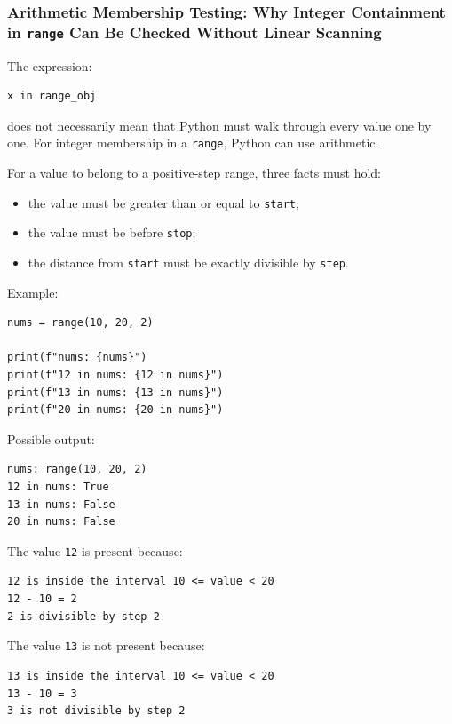 \documentclass[a4paper,twoside]{report}
\begin{document}
\subsubsection{Arithmetic Membership Testing: Why Integer Containment in \texttt{range} Can Be Checked Without Linear Scanning}

The expression:

\begin{verbatim}
x in range_obj
\end{verbatim}

does not necessarily mean that Python must walk through every value one by one. For integer membership in a \texttt{range}, Python can use arithmetic.

For a value to belong to a positive-step range, three facts must hold:

\begin{itemize}
    \item the value must be greater than or equal to \texttt{start};
    \item the value must be before \texttt{stop};
    \item the distance from \texttt{start} must be exactly divisible by \texttt{step}.
\end{itemize}

Example:

\begin{verbatim}
nums = range(10, 20, 2)

print(f"nums: {nums}")
print(f"12 in nums: {12 in nums}")
print(f"13 in nums: {13 in nums}")
print(f"20 in nums: {20 in nums}")
\end{verbatim}

Possible output:

\begin{verbatim}
nums: range(10, 20, 2)
12 in nums: True
13 in nums: False
20 in nums: False
\end{verbatim}

The value \texttt{12} is present because:

\begin{verbatim}
12 is inside the interval 10 <= value < 20
12 - 10 = 2
2 is divisible by step 2
\end{verbatim}

The value \texttt{13} is not present because:

\begin{verbatim}
13 is inside the interval 10 <= value < 20
13 - 10 = 3
3 is not divisible by step 2
\end{verbatim}
\end{document}
